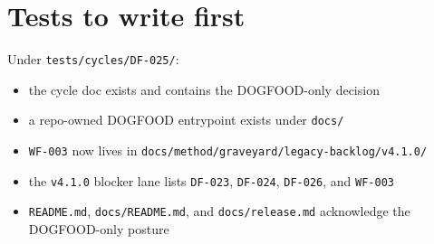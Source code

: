 \section{Tests to write first}\label{record-086-tests-to-write-first}

Under \texttt{t\allowbreak{}e\allowbreak{}s\allowbreak{}t\allowbreak{}s\allowbreak{}/\allowbreak{}c\allowbreak{}y\allowbreak{}c\allowbreak{}l\allowbreak{}e\allowbreak{}s\allowbreak{}/\allowbreak{}D\allowbreak{}F\allowbreak{}-\allowbreak{}0\allowbreak{}2\allowbreak{}5\allowbreak{}/}:

\begin{itemize}
\tightlist
\item
  the cycle doc exists and contains the DOGFOOD-only decision
\item
  a repo-owned DOGFOOD entrypoint exists under \texttt{d\allowbreak{}o\allowbreak{}c\allowbreak{}s\allowbreak{}/}
\item
  \texttt{W\allowbreak{}F\allowbreak{}-\allowbreak{}0\allowbreak{}0\allowbreak{}3} now lives in \texttt{d\allowbreak{}o\allowbreak{}c\allowbreak{}s\allowbreak{}/\allowbreak{}m\allowbreak{}e\allowbreak{}t\allowbreak{}h\allowbreak{}o\allowbreak{}d\allowbreak{}/\allowbreak{}g\allowbreak{}r\allowbreak{}a\allowbreak{}v\allowbreak{}e\allowbreak{}y\allowbreak{}a\allowbreak{}r\allowbreak{}d\allowbreak{}/\allowbreak{}l\allowbreak{}e\allowbreak{}g\allowbreak{}a\allowbreak{}c\allowbreak{}y\allowbreak{}-\allowbreak{}b\allowbreak{}a\allowbreak{}c\allowbreak{}k\allowbreak{}l\allowbreak{}o\allowbreak{}g\allowbreak{}/\allowbreak{}v\allowbreak{}4\allowbreak{}.\allowbreak{}1\allowbreak{}.\allowbreak{}0\allowbreak{}/}
\item
  the \texttt{v\allowbreak{}4\allowbreak{}.\allowbreak{}1\allowbreak{}.\allowbreak{}0} blocker lane lists \texttt{D\allowbreak{}F\allowbreak{}-\allowbreak{}0\allowbreak{}2\allowbreak{}3}, \texttt{D\allowbreak{}F\allowbreak{}-\allowbreak{}0\allowbreak{}2\allowbreak{}4}, \texttt{D\allowbreak{}F\allowbreak{}-\allowbreak{}0\allowbreak{}2\allowbreak{}6}, and \texttt{W\allowbreak{}F\allowbreak{}-\allowbreak{}0\allowbreak{}0\allowbreak{}3}
\item
  \texttt{R\allowbreak{}E\allowbreak{}A\allowbreak{}D\allowbreak{}M\allowbreak{}E\allowbreak{}.\allowbreak{}m\allowbreak{}d}, \texttt{d\allowbreak{}o\allowbreak{}c\allowbreak{}s\allowbreak{}/\allowbreak{}R\allowbreak{}E\allowbreak{}A\allowbreak{}D\allowbreak{}M\allowbreak{}E\allowbreak{}.\allowbreak{}m\allowbreak{}d}, and \texttt{d\allowbreak{}o\allowbreak{}c\allowbreak{}s\allowbreak{}/\allowbreak{}r\allowbreak{}e\allowbreak{}l\allowbreak{}e\allowbreak{}a\allowbreak{}s\allowbreak{}e\allowbreak{}.\allowbreak{}m\allowbreak{}d} acknowledge the DOGFOOD-only posture
\end{itemize}

